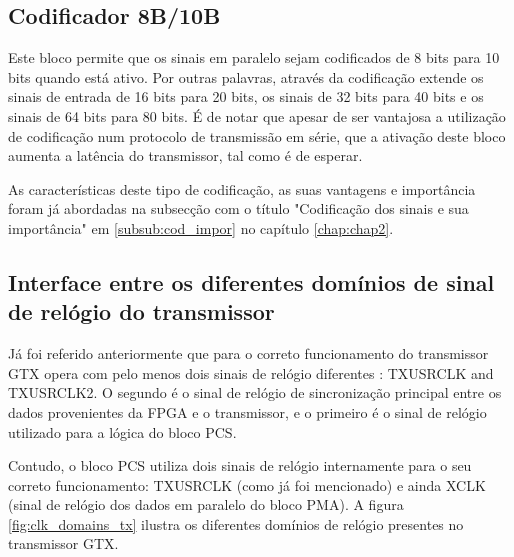 \subsection{Codificador 8B/10B}

Este bloco permite que os sinais em paralelo sejam codificados de 8 bits para 10 bits quando está ativo. Por outras palavras, através da codificação extende os sinais de entrada de 16 bits para 20 bits, os sinais de 32 bits para 40 bits e os sinais de 64 bits para 80 bits. É de notar que apesar de ser vantajosa a utilização de codificação num protocolo de transmissão em série, que a ativação deste bloco aumenta a latência do transmissor, tal como é de esperar.

As características deste tipo de codificação, as suas vantagens e importância foram já abordadas na subsecção com o título "Codificação dos sinais e sua importância" em \ref{subsub:cod_impor} no capítulo \ref{chap:chap2}.

%

\subsection{Interface entre os diferentes domínios de sinal de relógio do transmissor} \label{subsub:tx_buffer}

Já foi referido anteriormente que para o correto funcionamento do transmissor GTX opera com pelo menos dois sinais de relógio diferentes : TXUSRCLK and TXUSRCLK2. O segundo é o sinal de relógio de sincronização principal entre os dados provenientes da FPGA e o transmissor, e o primeiro é o sinal de relógio utilizado para a lógica do bloco PCS.

Contudo, o bloco PCS utiliza dois sinais de relógio internamente para o seu correto funcionamento: TXUSRCLK (como já foi mencionado) e ainda XCLK (sinal de relógio dos dados em paralelo do bloco PMA). A figura \ref{fig:clk_domains_tx} ilustra os diferentes domínios de relógio presentes no transmissor GTX.


